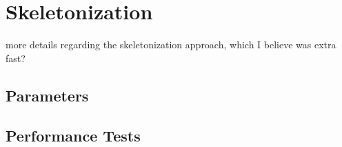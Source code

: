 \section{Skeletonization}

more details regarding the skeletonization approach, which I believe was extra fast?

\subsection{Parameters}

\subsection{Performance Tests}

